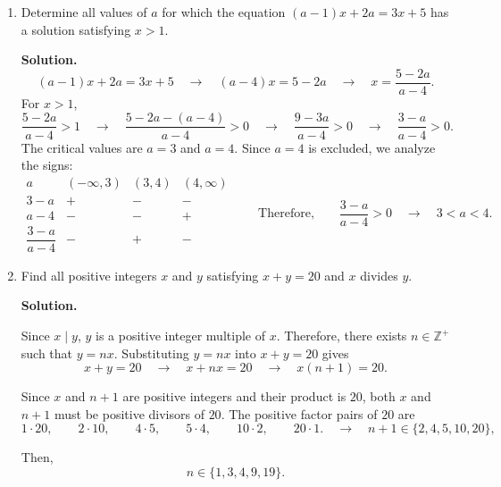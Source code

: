 	\begin{enumerate}
		
		\item
		Determine all values of $a$ for which the equation
		$(a-1)x+2a=3x+5$
		has a solution satisfying $x>1$.
		
		\textbf{Solution.}\vspace{-3mm}
		\[
		(a-1)x+2a=3x+5
		\quad\longrightarrow\quad
		(a-4)x=5-2a
		\quad\longrightarrow\quad
		x=\frac{5-2a}{a-4}.
		\]
		For $x>1$, \vspace*{-3mm}
		\[
		\frac{5-2a}{a-4}>1
		\quad\longrightarrow\quad
		\frac{5-2a-(a-4)}{a-4}>0
		\quad\longrightarrow\quad
		\frac{9-3a}{a-4}>0
		\quad\longrightarrow\quad
		\frac{3-a}{a-4}>0.
		\]
		The critical values are $a=3$ and $a=4$. Since $a=4$ is excluded,
		we analyze the signs: \vspace{-2mm}
		\[
		\begin{array}{c|ccc}
			a & (-\infty,3) & (3,4) & (4,\infty)\\
			\hline
			3-a & + & - & -\\
			a-4 & - & - & +\\
			\hline
			\dfrac{3-a}{a-4} & - & + & -
		\end{array}
		\qquad \text{Therefore,}\qquad
		\frac{3-a}{a-4}>0
		\quad\longrightarrow\quad
		\boxed{3<a<4}.
		\]
		
		\item
		Find all positive integers $x$ and $y$ satisfying
		$x+y=20$ and $x$ divides $y$.
		
		\textbf{Solution.}
		
		Since $x\mid y$, $y$ is a positive integer multiple of $x$. Therefore,
		there exists $n\in\mathbb Z^+$ such that
		$
		y=nx.
		$
		Substituting $y=nx$ into $x+y=20$ gives
		\[
		x+y=20
		\quad\longrightarrow\quad
		x+nx=20
		\quad\longrightarrow\quad
		x(n+1)=20.
		\]
		
		Since $x$ and $n+1$ are positive integers and their product is $20$,
		both $x$ and $n+1$ must be positive divisors of $20$.
		The positive factor pairs of $20$ are
		\[
		1\cdot20,\qquad
		2\cdot10,\qquad
		4\cdot5,\qquad
		5\cdot4,\qquad
		10\cdot2,\qquad
		20\cdot1.
		\quad\longrightarrow\quad
		n+1\in\{2,4,5,10,20\},
		\]
		\begin{minipage}[t]{0.38\textwidth}
			Then,
			\[
			n\in\{1,3,4,9,19\}.
			\]
			

\end{minipage}
\end{enumerate}
